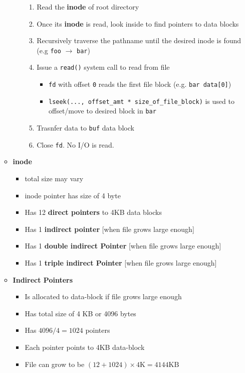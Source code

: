 \documentclass[12pt]{article}
\begin{document}
\begin{enumerate}[1.]
\begin{itemize}
\begin{itemize}
\begin{enumerate}[1.]
                \item Read the \textbf{inode} of root directory
                \item Once its \textbf{inode} is read, look inside to find pointers
                to data blocks
                \item Recursively traverse the pathname until the desired inode is found (e.g \texttt{foo} $\to$ \texttt{bar})
                \item Issue a \texttt{read()} system call to read from file

                \begin{itemize}
                    \item \texttt{fd} with offset \texttt{0} reads the first file block (e.g. \texttt{bar data[0]})
                    \item \texttt{lseek(..., offset\_amt * size\_of\_file\_block)} is used to offset/move to desired block in \texttt{bar}
                \end{itemize}

                \item Trasnfer data to \texttt{buf} data block

                \item Close \texttt{fd}. No I/O is read.
            \end{enumerate}
        \end{itemize}

        \item \textbf{inode}

        \begin{itemize}
            \item total size may vary
            \item inode pointer has size of 4 byte
            \item Has 12 \textbf{direct pointers} to 4KB data blocks
            \item Has 1 \textbf{indirect pointer} [when file grows large enough]
            \item Has 1 \textbf{double indirect Pointer} [when file grows large enough]
            \item Has 1 \textbf{triple indirect Pointer} [when file grows large enough]
        \end{itemize}

        \item \textbf{Indirect Pointers}

        \begin{itemize}
            \item Is allocated to data-block if file grows large enough
            \item Has total size of 4 KB or 4096 bytes
            \item Has $4096/4 = 1024$ pointers
            \item Each pointer points to 4KB data-block
            \item File can grow to be $(12 + 1024) \times 4\text{K} = 4144\text{KB}$
        \end{itemize}


\end{itemize}
\end{enumerate}
\end{document}
